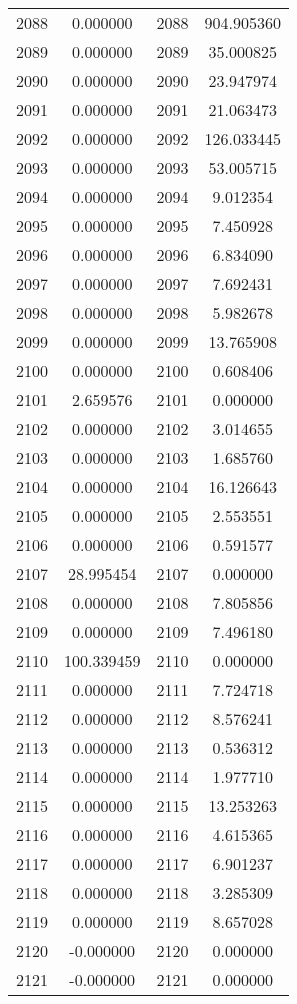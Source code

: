 \documentclass[12pt]{article}
\begin{document}
\begin{longtable}{@{}cccc@{}}
2088 & 0.000000 & 2088 & 904.905360 \\
2089 & 0.000000 & 2089 & 35.000825 \\
2090 & 0.000000 & 2090 & 23.947974 \\
2091 & 0.000000 & 2091 & 21.063473 \\
2092 & 0.000000 & 2092 & 126.033445 \\
2093 & 0.000000 & 2093 & 53.005715 \\
2094 & 0.000000 & 2094 & 9.012354 \\
2095 & 0.000000 & 2095 & 7.450928 \\
2096 & 0.000000 & 2096 & 6.834090 \\
2097 & 0.000000 & 2097 & 7.692431 \\
2098 & 0.000000 & 2098 & 5.982678 \\
2099 & 0.000000 & 2099 & 13.765908 \\
2100 & 0.000000 & 2100 & 0.608406 \\
2101 & 2.659576 & 2101 & 0.000000 \\
2102 & 0.000000 & 2102 & 3.014655 \\
2103 & 0.000000 & 2103 & 1.685760 \\
2104 & 0.000000 & 2104 & 16.126643 \\
2105 & 0.000000 & 2105 & 2.553551 \\
2106 & 0.000000 & 2106 & 0.591577 \\
2107 & 28.995454 & 2107 & 0.000000 \\
2108 & 0.000000 & 2108 & 7.805856 \\
2109 & 0.000000 & 2109 & 7.496180 \\
2110 & 100.339459 & 2110 & 0.000000 \\
2111 & 0.000000 & 2111 & 7.724718 \\
2112 & 0.000000 & 2112 & 8.576241 \\
2113 & 0.000000 & 2113 & 0.536312 \\
2114 & 0.000000 & 2114 & 1.977710 \\
2115 & 0.000000 & 2115 & 13.253263 \\
2116 & 0.000000 & 2116 & 4.615365 \\
2117 & 0.000000 & 2117 & 6.901237 \\
2118 & 0.000000 & 2118 & 3.285309 \\
2119 & 0.000000 & 2119 & 8.657028 \\
2120 & -0.000000 & 2120 & 0.000000 \\
2121 & -0.000000 & 2121 & 0.000000 \\

\end{longtable}
\end{document}
